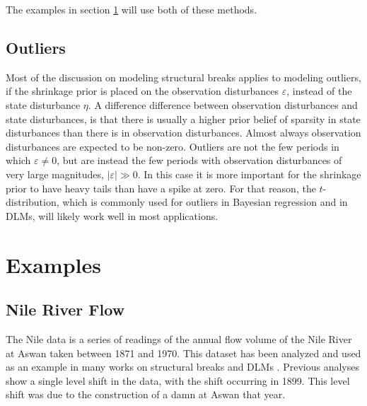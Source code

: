 \documentclass{article}
\begin{document}
The examples in section \ref{sec:examples} will use both of these methods.

\subsection{Outliers}
\label{sec:outliers}

Most of the discussion on modeling structural breaks applies to modeling outliers, if the shrinkage prior is placed on the observation disturbances $\varepsilon$, instead of the state disturbance $\eta$.
A difference difference between observation disturbances and state disturbances, is that there is usually a higher prior belief of sparsity in state disturbances than there is in observation disturbances. 
Almost always observation disturbances are expected to be non-zero.
Outliers are not the few periods in which $\varepsilon \neq 0$, but are instead the few periods with observation disturbances of very large magnitudes, $|\varepsilon| \gg 0$.
In this case it is more important for the shrinkage prior to have heavy tails than have a spike at zero.
For that reason, the $t$-distribution, which is commonly used for outliers in Bayesian regression and in DLMs, will likely work well in most applications.

\section{Examples}
\label{sec:examples}


\subsection{Nile River Flow}
\label{sec:nile}

The Nile data is a series of readings of the annual flow volume of the Nile River at Aswan taken between 1871 and 1970.
This dataset has been analyzed and used as an example in many works on structural breaks and DLMs \parencites{Cobb1978}{Balke1993}{JongPenzer1998}{DurbinKoopman2001}{DurbinKoopman2012}.
Previous analyses show a single level shift in the data, with the shift occurring in 1899.
This level shift was due to the construction of a damn at Aswan that year.
\end{document}

